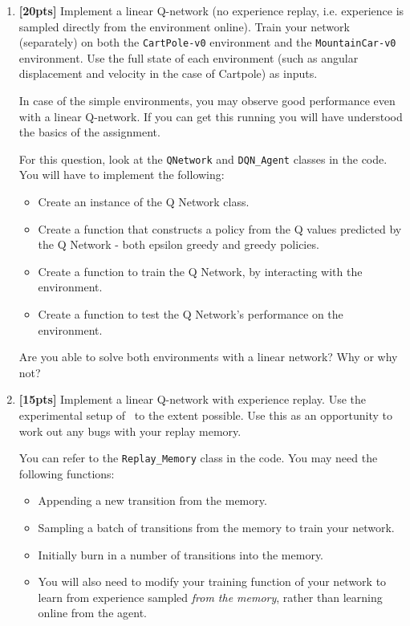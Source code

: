 \documentclass[12pt]{article}
\begin{document}
\begin{enumerate}

    \item\textbf{[20pts]} Implement a linear Q-network (no experience replay, i.e. experience is sampled directly from the environment online). Train your network (separately) on both the \texttt{CartPole-v0} environment and the \texttt{MountainCar-v0} environment. Use the full state of each environment (such as angular displacement and velocity in the case of Cartpole) as inputs.
              
    In case of the simple environments, you may observe good performance even with a linear Q-network. If you can get this running you will have understood the basics of the assignment. 
    
    For this question, look at the \texttt{QNetwork} and \texttt{DQN\_Agent} classes in the code. You will have to implement the following: 
    \begin{itemize}
        \item Create an instance of the Q Network class.
        \item Create a function that constructs a policy from the Q values predicted by the Q Network - both epsilon greedy and greedy policies.
        \item Create a function to train the Q Network, by interacting with the environment.
        \item  Create a function to test the Q Network's performance on the environment.
    \end{itemize}
    
    Are you able to solve both environments with a linear network? Why or why not? 


    \item \textbf{[15pts]} Implement a linear Q-network with experience replay. Use the experimental setup of~\cite{mnih2013playing, mnih2015human} to the extent possible. Use this as an opportunity to work out any bugs with your replay memory.
    
    You can refer to the \texttt{Replay\_Memory} class in the code. You may need the following functions: 
    \begin{itemize}
        \item Appending a new transition from the memory. 
        \item Sampling a batch of transitions from the memory to train your network. 
        \item Initially burn in a number of transitions into the memory. 
        \item You will also need to modify your training function of your network to learn from experience sampled \textit{from the memory}, rather than learning online from the agent. 
    \end{itemize}
              

\end{enumerate}
\end{document}
